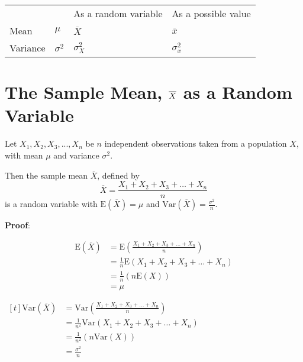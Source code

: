 \documentclass[11pt,a4paper]{book}
\begin{document}
\begin{tabular}{|>{\centering}m{3.5cm}|>{\centering}m{3.5cm}|>{\centering}m{3.5cm}|>{\centering}m{3.5cm}|}
\hline
\multirow{2}{3.5cm}{\hspace{31bp}Quantity} & \multirow{2}{3.5cm}{\hspace{25bp}Population} & \multicolumn{2}{c|}{Sample}\tabularnewline
\cline{3-4} \cline{4-4}
 &  & As a random variable & As a possible value\tabularnewline
\hline
Mean & $\mu$ & $\overline{X}$ & $\overline{x}$\tabularnewline
\hline
Variance & $\sigma^{2}$ & $\sigma_{X}^{2}$ & $\sigma_{x}^{2}$\tabularnewline
\hline
\end{tabular}

\newpage


\section{The Sample Mean, $\textbf{\ensuremath{\overline{X}}}$ as a Random Variable}

Let $X_{1},X_{2},X_{3},...,X_{n}$ be $n$ independent observations
taken from a population $X$, with mean $\mu$ and variance $\sigma^{2}$.

Then the sample mean $\overline{X}$, defined by
\[
\overline{X}=\frac{X_{1}+X_{2}+X_{3}+\ldots+X_{n}}{n}
\]
is a random variable with $\text{E}\left(\overline{X}\right)=\mu$
and ${\displaystyle \text{Var}\left(\overline{X}\right)=\frac{\sigma^{2}}{n}}$.

\begin{fleqn}

\textbf{Proof}:

\begin{minipage}[t]{0.5\textwidth}

\begin{align*}
\text{E}\left(\overline{X}\right) & =\text{E}\left(\frac{X_{1}+X_{2}+X_{3}+\ldots+X_{n}}{n}\right)\\
 & =\frac{1}{n}\text{E}\left(X_{1}+X_{2}+X_{3}+\ldots+X_{n}\right)\\
 & =\frac{1}{n}\left(n\text{E}\left(X\right)\right)\\
 & =\mu
\end{align*}

\end{minipage}
\hfill\vline\hfill
\begin{minipage}[t]{0.5\textwidth}

$
\begin{aligned}[t]
\text{Var}\left(\overline{X}\right) & =\text{Var}\left(\frac{X_{1}+X_{2}+X_{3}+\ldots+X_{n}}{n}\right)\\
 & =\frac{1}{n^{2}}\text{Var}\left(X_{1}+X_{2}+X_{3}+\ldots+X_{n}\right)\\
 & =\frac{1}{n^{2}}\left(n\text{Var}\left(X\right)\right)\\
 & =\frac{\sigma^{2}}{n}
\end{aligned}
$

\end{minipage}

\end{fleqn}
\end{document}
